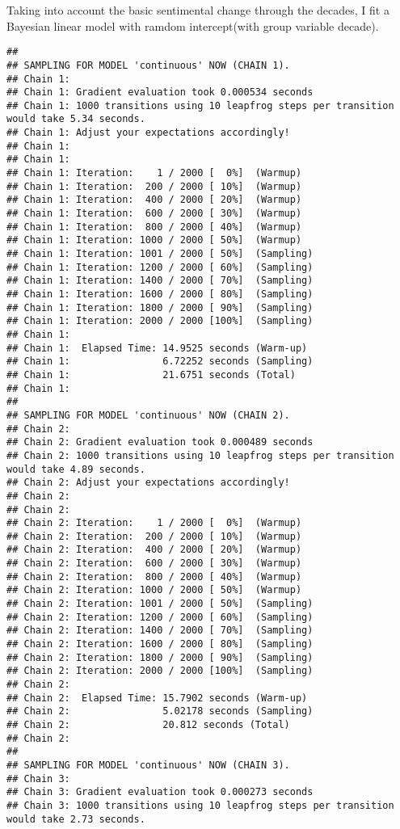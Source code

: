 \documentclass[]{article}
\begin{document}
Taking into account the basic sentimental change through the decades, I
fit a Bayesian linear model with ramdom intercept(with group variable
decade).

\begin{verbatim}
## 
## SAMPLING FOR MODEL 'continuous' NOW (CHAIN 1).
## Chain 1: 
## Chain 1: Gradient evaluation took 0.000534 seconds
## Chain 1: 1000 transitions using 10 leapfrog steps per transition would take 5.34 seconds.
## Chain 1: Adjust your expectations accordingly!
## Chain 1: 
## Chain 1: 
## Chain 1: Iteration:    1 / 2000 [  0%]  (Warmup)
## Chain 1: Iteration:  200 / 2000 [ 10%]  (Warmup)
## Chain 1: Iteration:  400 / 2000 [ 20%]  (Warmup)
## Chain 1: Iteration:  600 / 2000 [ 30%]  (Warmup)
## Chain 1: Iteration:  800 / 2000 [ 40%]  (Warmup)
## Chain 1: Iteration: 1000 / 2000 [ 50%]  (Warmup)
## Chain 1: Iteration: 1001 / 2000 [ 50%]  (Sampling)
## Chain 1: Iteration: 1200 / 2000 [ 60%]  (Sampling)
## Chain 1: Iteration: 1400 / 2000 [ 70%]  (Sampling)
## Chain 1: Iteration: 1600 / 2000 [ 80%]  (Sampling)
## Chain 1: Iteration: 1800 / 2000 [ 90%]  (Sampling)
## Chain 1: Iteration: 2000 / 2000 [100%]  (Sampling)
## Chain 1: 
## Chain 1:  Elapsed Time: 14.9525 seconds (Warm-up)
## Chain 1:                6.72252 seconds (Sampling)
## Chain 1:                21.6751 seconds (Total)
## Chain 1: 
## 
## SAMPLING FOR MODEL 'continuous' NOW (CHAIN 2).
## Chain 2: 
## Chain 2: Gradient evaluation took 0.000489 seconds
## Chain 2: 1000 transitions using 10 leapfrog steps per transition would take 4.89 seconds.
## Chain 2: Adjust your expectations accordingly!
## Chain 2: 
## Chain 2: 
## Chain 2: Iteration:    1 / 2000 [  0%]  (Warmup)
## Chain 2: Iteration:  200 / 2000 [ 10%]  (Warmup)
## Chain 2: Iteration:  400 / 2000 [ 20%]  (Warmup)
## Chain 2: Iteration:  600 / 2000 [ 30%]  (Warmup)
## Chain 2: Iteration:  800 / 2000 [ 40%]  (Warmup)
## Chain 2: Iteration: 1000 / 2000 [ 50%]  (Warmup)
## Chain 2: Iteration: 1001 / 2000 [ 50%]  (Sampling)
## Chain 2: Iteration: 1200 / 2000 [ 60%]  (Sampling)
## Chain 2: Iteration: 1400 / 2000 [ 70%]  (Sampling)
## Chain 2: Iteration: 1600 / 2000 [ 80%]  (Sampling)
## Chain 2: Iteration: 1800 / 2000 [ 90%]  (Sampling)
## Chain 2: Iteration: 2000 / 2000 [100%]  (Sampling)
## Chain 2: 
## Chain 2:  Elapsed Time: 15.7902 seconds (Warm-up)
## Chain 2:                5.02178 seconds (Sampling)
## Chain 2:                20.812 seconds (Total)
## Chain 2: 
## 
## SAMPLING FOR MODEL 'continuous' NOW (CHAIN 3).
## Chain 3: 
## Chain 3: Gradient evaluation took 0.000273 seconds
## Chain 3: 1000 transitions using 10 leapfrog steps per transition would take 2.73 seconds.

\end{verbatim}
\end{document}
